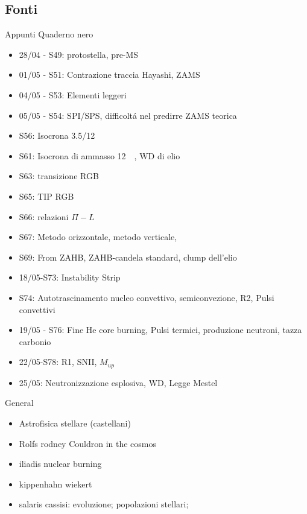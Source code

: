 \subsection{Fonti}

\begin{frame}{Appunti Quaderno nero}
            \begin{itemize}
                \item 28/04 - S49: protostella, pre-MS
                \item 01/05 - S51: Contrazione traccia Hayashi, ZAMS
                \item 04/05 - S53: Elementi leggeri
                \item 05/05 - S54: SPI/SPS, difficolt\'a nel predirre ZAMS teorica
                \item S56: Isocrona 3.5/12\si{\giga\year}
                \item S61: Isocrona di ammasso \SI{12}{\giga\year}, WD di elio
                \item S63: transizione RGB
                \item S65: TIP RGB
                \item S66: relazioni $\Pi-L$
                \item S67: Metodo orizzontale, metodo verticale, 
                \item S69: From ZAHB, ZAHB-candela standard, clump dell'elio
                \item 18/05-S73: Instability Strip
                \item S74: Autotrascinamento nucleo convettivo, semiconvezione, R2, Pulsi convettivi
                \item 19/05 - S76: Fine He core burning, Pulsi termici, produzione neutroni, tazza carbonio
                \item 22/05-S78: R1, SNII, $M_{up}$
                \item 25/05: Neutronizzazione esplosiva, WD, Legge Mestel
            \end{itemize}
\end{frame}

\begin{frame}{General}
\begin{itemize}
\item Astrofisica stellare (castellani)
\item Rolfs rodney Couldron in the cosmos
\item iliadis nuclear burning
\item kippenhahn wiekert
\item salaris cassisi: evoluzione; popolazioni stellari;
\end{itemize}
\end{frame}

